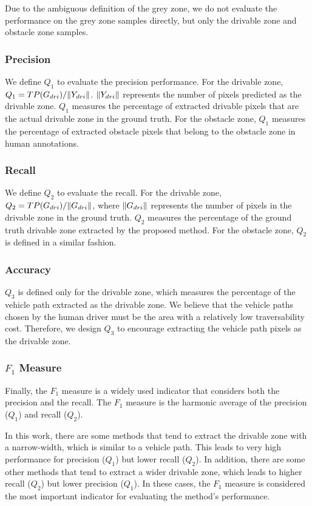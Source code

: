 \documentclass[letterpaper, 10 pt, conference]{ieeeconf}  %
\begin{document}
Due to the ambiguous definition of the grey zone, we do not evaluate the performance on the grey zone samples directly, but only the drivable zone and obstacle zone samples.

\subsubsection{Precision}
We define $Q_1$ to evaluate the precision performance. For the drivable zone, $Q_1={TP(G_{dri})}/{\Arrowvert Y_{dri} \Arrowvert}$. ${\Arrowvert Y_{dri} \Arrowvert}$ represents the number of pixels predicted as the drivable zone. $Q_1$ measures the percentage of extracted drivable pixels that are the actual drivable zone in the ground truth. For the obstacle zone, $Q_1$ measures the percentage of extracted obstacle pixels that belong to the obstacle zone in human annotations.
\subsubsection{Recall}
We define $Q_2$ to evaluate the recall. For the drivable zone, $Q_2={TP(G_{dri})}/{\Arrowvert G_{dri} \Arrowvert}$, where ${\Arrowvert G_{dri} \Arrowvert}$ represents the number of pixels in the drivable zone in the ground truth. $Q_2$ measures the percentage of the ground truth drivable zone extracted by the proposed method. For the obstacle zone, $Q_2$ is defined in a similar fashion.
\subsubsection{Accuracy}
$Q_3$ is defined only for the drivable zone, which measures the percentage of the vehicle path extracted as the drivable zone. We believe that the vehicle paths chosen by the human driver must be the area with a relatively low traversability cost. Therefore, we design $Q_3$ to encourage extracting the vehicle path pixels as the drivable zone.
\subsubsection{$F_1$ Measure}
Finally, the $F_1$ measure is a widely used indicator that considers both the precision and the recall. The $F_1$ measure is the harmonic average of the precision ($Q_1$) and recall ($Q_2$). 

In this work, there are some methods that tend to extract the drivable zone with a narrow-width, which is similar to a vehicle path. This leads to very high performance for precision ($Q_1$) but lower recall ($Q_2$). In addition, there are some other methods that tend to extract a wider drivable zone, which leads to higher recall ($Q_2$) but lower precision ($Q_1$). In these cases, the $F_1$ measure is considered the most important indicator for evaluating the method’s performance.
\end{document}
